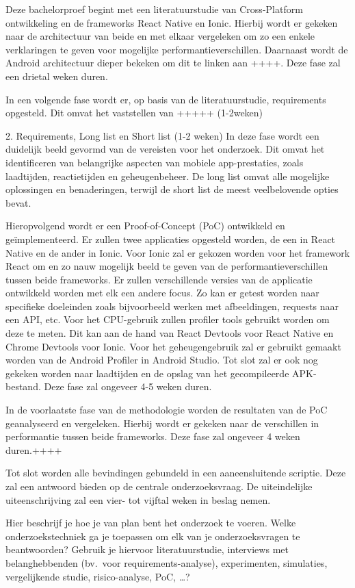 Deze bachelorproef begint met een literatuurstudie van Cross-Platform ontwikkeling en de frameworks React Native en Ionic. Hierbij wordt er gekeken naar de architectuur van beide en met elkaar vergeleken om zo een enkele verklaringen te geven voor mogelijke performantieverschillen. Daarnaast wordt de Android architectuur dieper bekeken om dit te linken aan ++++. Deze fase zal een drietal weken duren.

In een volgende fase wordt er, op basis van de literatuurstudie, requirements opgesteld. Dit omvat het vaststellen van +++++ (1-2weken)

2. Requirements, Long list en Short list (1-2 weken)
In deze fase wordt een duidelijk beeld gevormd van de vereisten voor het onderzoek. Dit omvat het identificeren van belangrijke aspecten van mobiele app-prestaties, zoals laadtijden, reactietijden en geheugenbeheer. De long list omvat alle mogelijke oplossingen en benaderingen, terwijl de short list de meest veelbelovende opties bevat.

Hieropvolgend wordt er een Proof-of-Concept (PoC) ontwikkeld en geïmplementeerd. Er zullen twee applicaties opgesteld worden, de een in React Native en de ander in Ionic. Voor Ionic zal er gekozen worden voor het framework React om en zo nauw mogelijk beeld te geven van de performantieverschillen tussen beide frameworks. Er zullen verschillende versies van de applicatie ontwikkeld worden met elk een andere focus. Zo kan er getest worden naar specifieke doeleinden zoals bijvoorbeeld werken met afbeeldingen, requests naar een API, etc. Voor het CPU-gebruik zullen profiler tools gebruikt worden om deze te meten. Dit kan aan de hand van React Devtools voor React Native en Chrome Devtools voor Ionic. Voor het geheugengebruik zal er gebruikt gemaakt worden van de Android Profiler in Android Studio. Tot slot zal er ook nog gekeken worden naar laadtijden en de opslag van het gecompileerde APK-bestand. Deze fase zal ongeveer 4-5 weken duren.

In de voorlaatste fase van de methodologie worden de resultaten van de PoC geanalyseerd en vergeleken. Hierbij wordt er gekeken naar de verschillen in performantie tussen beide frameworks. Deze fase zal ongeveer 4 weken duren.++++

Tot slot worden alle bevindingen gebundeld in een aaneensluitende scriptie. Deze zal een antwoord bieden op de centrale onderzoeksvraag. De uiteindelijke uiteenschrijving zal een vier- tot vijftal weken in beslag nemen.

Hier beschrijf je hoe je van plan bent het onderzoek te voeren. Welke onderzoekstechniek ga je toepassen om elk van je onderzoeksvragen te beantwoorden? Gebruik je hiervoor literatuurstudie, interviews met belanghebbenden (bv.~voor requirements-analyse), experimenten, simulaties, vergelijkende studie, risico-analyse, PoC, \ldots?

